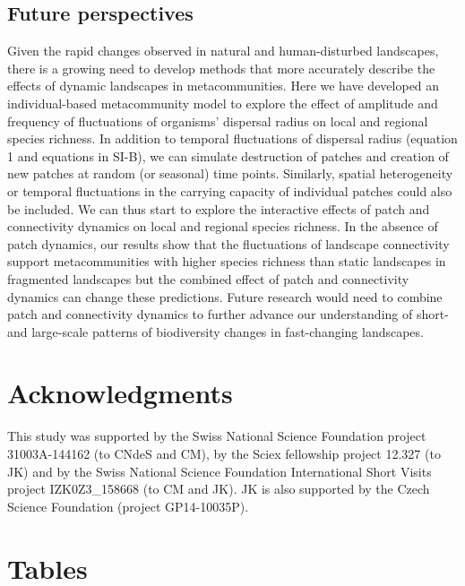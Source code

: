 \documentclass[12pt]{article}
\begin{document}
    \subsection*{Future perspectives}
    
    
Given the rapid changes observed in natural and human-disturbed landscapes, there is a growing need to develop methods that more accurately describe the effects of dynamic landscapes in metacommunities. Here we have developed an individual-based metacommunity model to explore the effect of amplitude and frequency of fluctuations of organisms' dispersal radius on local and regional species richness. In addition to temporal fluctuations of dispersal radius (equation 1 and equations in SI-B), we can simulate destruction of patches and creation of new patches at random (or seasonal) time points. Similarly, spatial heterogeneity or temporal fluctuations in the carrying capacity of individual patches could also be included. We can thus start to explore the interactive effects of patch and connectivity dynamics on local and regional species richness. In the absence of patch dynamics, our results show that the fluctuations of landscape connectivity support metacommunities with higher species richness than static landscapes in fragmented landscapes but the combined effect of patch and connectivity dynamics can change these predictions. Future research would need to combine patch and connectivity dynamics to further advance our understanding of short- and large-scale patterns of biodiversity changes in fast-changing landscapes. 

\section*{Acknowledgments}

This study was supported by the Swiss National Science Foundation project 31003A-144162 (to CNdeS and CM), by the Sciex fellowship project 12.327 (to JK) and by the Swiss National Science Foundation International Short Visits project IZK0Z3\_158668 (to CM and JK). JK is also supported by the Czech Science Foundation (project GP14-10035P).

\newpage



\newpage
{}
\section*{Tables}
\end{document}
